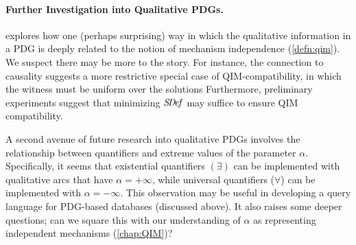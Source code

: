\paragraph{Further Investigation into Qualitative PDGs.}
 explores how one (perhaps surprising) way in which the qualitative information in a PDG is deeply related to the notion of mechanism independence (\cref{defn:qim}).
We suspect there may be more to the story. 
For instance, the connection to causality suggests a more restrictive special case of QIM-compatibility, in which the witness must be uniform over the solutions
%
Furthermore, preliminary experiments suggest that minimizing $\mathit{S\mskip-3.5muD\mskip-2.5mue\mskip-1.5muf}$ may suffice to ensure QIM compatibility. 

A second avenue of future research into qualitative PDGs involves the relationship between quantifiers and extreme values of the parameter $\alpha$. 
Specifically, it seems that existential quantifiers $(\exists)$ can be implemented with qualitative arcs that have $\alpha = +\infty$, while universal quantifiers ($\forall$) can be implemented with $\alpha = -\infty$. 
This observation may be useful in developing a query language for PDG-based databases (discussed above).
It also raises some deeper questions;
can we square this with our understanding of $\alpha$ as representing independent mechanisms (\cref{chap:QIM})?



